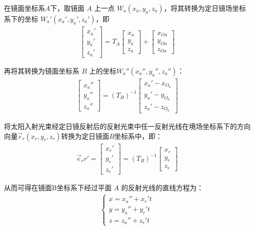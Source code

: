 \documentclass[../main.tex]{subfiles}
\begin{document}
\par 在镜面坐标系$A$下，取镜面 \( A \) 上一点 \( W_a (x_a,y_a,z_a) \)，将其转换为定日镜场坐标系下的坐标 \( W_a' (x_a', y_a', z_a') \)，即
\begin{align}\label{1.78}
 \begin{bmatrix}
x_a' \\
y_a' \\
z_a'
\end{bmatrix}
= T_{A} \begin{bmatrix}
x_a \\
y_a \\
z_a
\end{bmatrix}
+ \begin{bmatrix}
x_{Oa} \\
y_{Oa} \\
z_{Oa}
\end{bmatrix}
\end{align}
\par 再将其转换为镜面坐标系 \( B \) 上的坐标$W_a''(x_a'',y_a'',z_a'')$：
\begin{align}\label{1.45678}
 \begin{bmatrix}
x_a'' \\
y_a'' \\
z_a''
\end{bmatrix}
= (T_B)^{-1} \begin{bmatrix}
x_a' - x_{O_b} \\
y_a' - y_{O_b} \\
z_a' - z_{O_b}
\end{bmatrix}
\end{align}
\par 将太阳入射光束经定日镜反射后的反射光束中任一反射光线在境场坐标系下的方向向量$\vec{e}_r(x_r, y_r, z_r)$转换为定日镜面$B$坐标系中，即：
\begin{align} \label{1.33}
  \vec{e}_rr' = \begin{bmatrix}
x_r' \\
y_r' \\
z_r'
\end{bmatrix} = ({T_B})^{-1} \begin{bmatrix}
x_r \\
y_r \\
z_r
\end{bmatrix}
\end{align}
\par  从而可得在镜面B坐标系下经过平面 $A$ 的反射光线的直线方程为：
\begin{align} \label{1.34}
 \begin{cases}
x = x_a'' + x_r' t \\
y = y_a'' + y_r' t \\
z = z_a'' + z_r' t
\end{cases}
\end{align}
\end{document}
